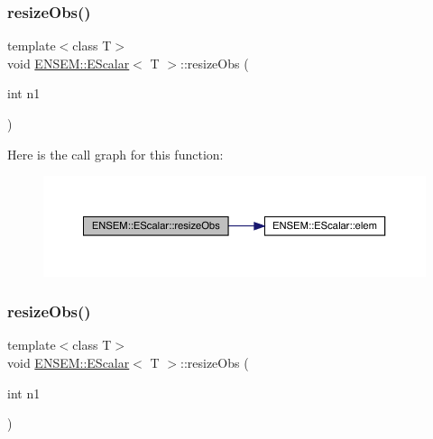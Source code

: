 \subsubsection{\texorpdfstring{resizeObs()}{resizeObs()}\hspace{0.1cm}{\footnotesize\ttfamily [2/12]}}
{\footnotesize\ttfamily template$<$class T$>$ \\
void \mbox{\hyperlink{classENSEM_1_1EScalar}{E\+N\+S\+E\+M\+::\+E\+Scalar}}$<$ T $>$\+::resize\+Obs (\begin{DoxyParamCaption}\item[{int}]{n1 }\end{DoxyParamCaption})\hspace{0.3cm}{\ttfamily [inline]}}

Here is the call graph for this function\+:
\nopagebreak
\begin{figure}[H]
\begin{center}
\leavevmode
\includegraphics[width=350pt]{d0/d82/classENSEM_1_1EScalar_af9faf602be10ce072be3fc532a7e17fe_cgraph}
\end{center}
\end{figure}
\mbox{\label{classENSEM_1_1EScalar_af9faf602be10ce072be3fc532a7e17fe}} 
\subsubsection{\texorpdfstring{resizeObs()}{resizeObs()}\hspace{0.1cm}{\footnotesize\ttfamily [3/12]}}
{\footnotesize\ttfamily template$<$class T$>$ \\
void \mbox{\hyperlink{classENSEM_1_1EScalar}{E\+N\+S\+E\+M\+::\+E\+Scalar}}$<$ T $>$\+::resize\+Obs (\begin{DoxyParamCaption}\item[{int}]{n1 }\end{DoxyParamCaption})\hspace{0.3cm}{\ttfamily [inline]}}

